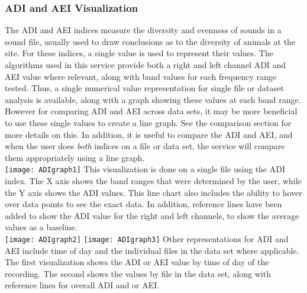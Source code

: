 \subsubsection{ADI and AEI Visualization}
The ADI and AEI indices measure the diversity and evenness of sounds in a sound file, usually used to draw conclusions as to the diversity of animals at the site. For these indices, a single value is used to represent their values. The algorithms used in this service provide both a right and left channel ADI and AEI value where relevant, along with band values for each frequency range tested. Thus, a single numerical value representation for single file or dataset analysis is available, along with a graph showing these values at each band range. However for comparing ADI and AEI across data sets, it may be more beneficial to use these single values to create a line graph. See the comparison section for more details on this. In addition, it is useful to compare the ADI and AEI, and when the user does \textit{both} indices on a file or data set, the service will compare them appropriately using a line graph.\\

\texttt{[image: ADIgraph1]}
This visualization is done on a single file using the ADI index. The X axis shows the band ranges that were determined by the user, while the Y axis shows the ADI values. This line chart also includes the ability to hover over data points to see the exact data. In addition, reference lines have been added to show the ADI value for the right and left channels, to show the average values as a baseline.\\

\texttt{[image: ADIgraph2]}
\texttt{[image: ADIgraph3]}
Other representations for ADI and AEI include time of day and the individual files in the data set where applicable. The first visualization shows the ADI or AEI value by time of day of the recording. The second shows the values by file in the data set, along with reference lines for overall ADI and or AEI.

